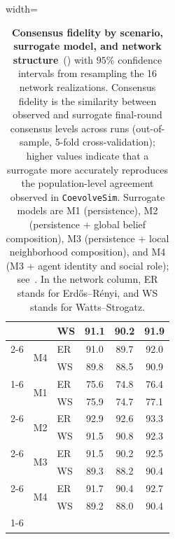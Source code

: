 \begin{table}[ht]
\begin{adjustbox}{width=\columnwidth}
\begin{tabular}{lllccc}
 &  & WS & 91.1 & 90.2 & 91.9 \\
\cline{2-6}
 & \multirow[c]{2}{*}{M4} & ER & 91.0 & 89.7 & 92.0 \\
 &  & WS & 89.8 & 88.5 & 90.9 \\
\cline{1-6} \cline{2-6}
\multirow[c]{8}{*}{IV. Specialists (matched)} & \multirow[c]{2}{*}{M1} & ER & 75.6 & 74.8 & 76.4 \\
 &  & WS & 75.9 & 74.7 & 77.1 \\
\cline{2-6}
 & \multirow[c]{2}{*}{M2} & ER & 92.9 & 92.6 & 93.3 \\
 &  & WS & 91.5 & 90.8 & 92.3 \\
\cline{2-6}
 & \multirow[c]{2}{*}{M3} & ER & 91.5 & 90.2 & 92.5 \\
 &  & WS & 89.3 & 88.2 & 90.4 \\
\cline{2-6}
 & \multirow[c]{2}{*}{M4} & ER & 91.7 & 90.4 & 92.7 \\
 &  & WS & 89.2 & 88.0 & 90.4 \\
\cline{1-6} \cline{2-6}
\bottomrule
\end{tabular}
\end{adjustbox}
\caption{\textbf{Consensus fidelity by scenario, surrogate model, and network structure}~() with \(95\%\) confidence intervals from resampling the 16 network realizations. Consensus fidelity is the similarity between observed and surrogate final-round consensus levels across runs (out-of-sample, 5-fold cross-validation); higher values indicate that a surrogate more accurately reproduces the population-level agreement observed in \texttt{CoevolveSim}. Surrogate models are M1 (persistence), M2 (persistence + global belief composition), M3 (persistence + local neighborhood composition), and M4 (M3 + agent identity and social role); see~. In the network column, ER stands for Erd\H{o}s--R\'enyi, and WS stands for Watts--Strogatz.}
\label{tab:consensus-fidelity}
\end{table}
